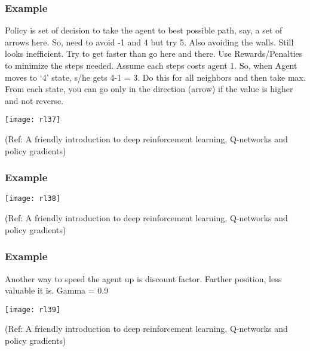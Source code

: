 \begin{frame}[fragile]\frametitle{Example}

Policy is set of decision to take the agent to best possible path, say, a set of arrows here. So, need to avoid -1 and 4 but try 5. Also avoiding the walls. Still looks inefficient. Try to get faster than go here and there. Use Rewards/Penalties to minimize the steps needed. Assume each steps costs agent 1. So, when Agent moves to ‘4' state, s/he gets 4-1 = 3. Do this for all neighbors and then take max. From each state, you can go only in the direction (arrow) if the value is higher and not reverse.

\begin{center}
\texttt{[image: rl37]}
\end{center}

{\tiny (Ref: A friendly introduction to deep reinforcement learning, Q-networks and policy gradients)}

\end{frame}

\begin{frame}[fragile]\frametitle{Example}

\begin{center}
\texttt{[image: rl38]}
\end{center}

{\tiny (Ref: A friendly introduction to deep reinforcement learning, Q-networks and policy gradients)}

\end{frame}

\begin{frame}[fragile]\frametitle{Example}

Another way to speed the agent up is discount factor. Farther position, less valuable it is. Gamma = 0.9

\begin{center}
\texttt{[image: rl39]}
\end{center}

{\tiny (Ref: A friendly introduction to deep reinforcement learning, Q-networks and policy gradients)}

\end{frame}


